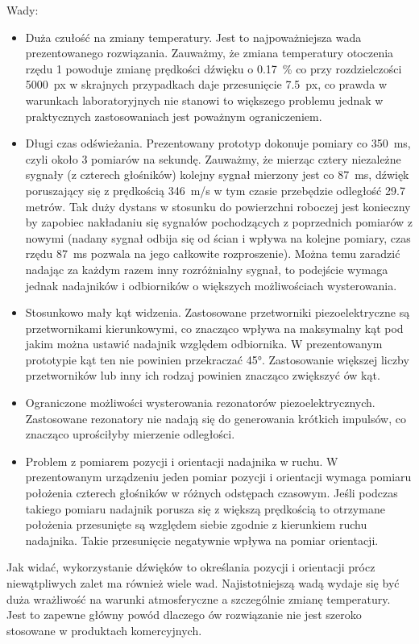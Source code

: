 Wady:
\begin{itemize}
 \item Duża czułość na zmiany temperatury. Jest to najpoważniejsza wada prezentowanego rozwiązania.
 Zauważmy, że zmiana temperatury otoczenia rzędu \SI{1}{\degC} powoduje zmianę prędkości dźwięku o \SI{0,17}{\%} 
 co przy rozdzielczości \SI{5000}{px} w skrajnych przypadkach daje przesunięcie \SI{7.5}{px},
 co prawda w warunkach laboratoryjnych nie stanowi to większego problemu jednak w praktycznych zastosowaniach
 jest poważnym ograniczeniem.
 
 \item Długi czas odświeżania. Prezentowany prototyp dokonuje pomiary co \SI{350}{ms}, czyli około 3 pomiarów 
 na sekundę. Zauważmy, że mierząc cztery niezależne sygnały (z czterech głośników) kolejny sygnał mierzony jest co \SI{87}{ms},
  dźwięk poruszający się z prędkością \SI{346}{m/s} w tym czasie przebędzie odległość 29.7 metrów.
 Tak duży dystans w stosunku do powierzchni roboczej jest konieczny by zapobiec nakładaniu się sygnałów pochodzących z poprzednich
 pomiarów z nowymi (nadany sygnał odbija się od ścian i wpływa na kolejne pomiary, czas rzędu \SI{87}{ms} pozwala 
 na jego całkowite rozproszenie).
 Można temu zaradzić nadając za każdym razem inny rozróżnialny sygnał, to podejście 
 wymaga jednak nadajników i odbiorników o większych możliwościach wysterowania.
 
 \item Stosunkowo mały kąt widzenia. Zastosowane przetworniki piezoelektryczne są przetwornikami kierunkowymi, co 
 znacząco wpływa na maksymalny kąt pod jakim można ustawić nadajnik względem odbiornika. W prezentowanym 
 prototypie kąt ten nie powinien przekraczać \ang{45}. Zastosowanie większej liczby przetworników lub inny ich rodzaj
 powinien znacząco zwiększyć ów kąt.

 \item Ograniczone możliwości wysterowania rezonatorów piezoelektrycznych. 
 Zastosowane rezonatory nie nadają się do generowania krótkich impulsów, co znacząco uprościłyby mierzenie odległości.
 
 \item Problem z pomiarem pozycji i orientacji nadajnika w ruchu. W prezentowanym urządzeniu 
 jeden pomiar pozycji i orientacji wymaga pomiaru położenia czterech głośników w różnych odstępach czasowym.
 Jeśli podczas takiego pomiaru nadajnik porusza się z większą prędkością to otrzymane położenia
 przesunięte są względem siebie zgodnie z kierunkiem ruchu nadajnika. Takie przesunięcie negatywnie wpływa na 
 pomiar orientacji. 
\end{itemize}


Jak widać, wykorzystanie dźwięków to określania pozycji i orientacji prócz niewątpliwych zalet ma również
wiele wad. Najistotniejszą wadą wydaje się być duża wrażliwość na warunki atmosferyczne a szczególnie zmianę temperatury.
Jest to zapewne główny powód dlaczego ów rozwiązanie nie jest szeroko stosowane w produktach komercyjnych.



